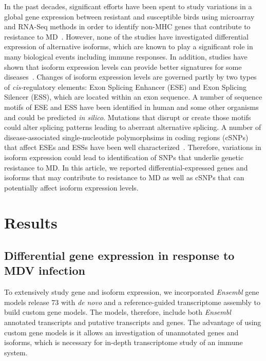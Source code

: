 \documentclass[10pt]{article}
\begin{document}
In the past decades, significant efforts have been spent to study variations in a global gene
expression between resistant and susceptible birds using
microarray and RNA-Seq methods in order to identify non-MHC genes that contribute
to resistance to MD~\cite{}.
However, none of the studies have investigated differential expression of alternative isoforms,
which are known to play a significant role in many biological events including
immune responses.
In addition, studies have shown that isoform expression levels can provide better signatures for some
diseases~\cite{zhang2013isoform}.
Changes of isoform expression levels are governed partly by two types of \textit{cis-}regulatory
elements: Exon Splicing Enhancer (ESE) and Exon Splicing Silencer (ESS),
which are located within an exon sequence.
A number of sequence motifs of ESE and ESS have been identified in human and some other organisms
and could be predicted \textit{in silico}.
Mutations that disrupt or create those motifs could alter splicing
patterns leading to aberrant alternative splicing.
A number of disease-associated single-nucleotide polymorphsims in coding regions
(cSNPs) that affect ESEs and ESSs have been well
characterized~\cite{blencowe2000exonic, wang2007splicing}.
Therefore, variations in isoform expression could lead to identification of SNPs
that underlie genetic resistance to MD.
In this article, we reported differential-expressed genes and isoforms that may contribute to
resistance to MD as well as cSNPs that can potentially affect isoform expression levels.


\section*{Results}

\subsection*{Differential gene expression in response to MDV infection}

To extensively study gene and isoform expression, we incorporated \textit{Ensembl} gene models
release 73 with \textit{de novo} and a reference-guided transcriptome assembly to build custom
gene models.
The models, therefore, include both \textit{Ensembl} annotated transcripts
and putative transcripts and genes.
The advantage of using custom gene models is it allows an investigation of unannotated genes and
isoforms, which is necessary for in-depth transcriptome study of an immune system.
\end{document}
